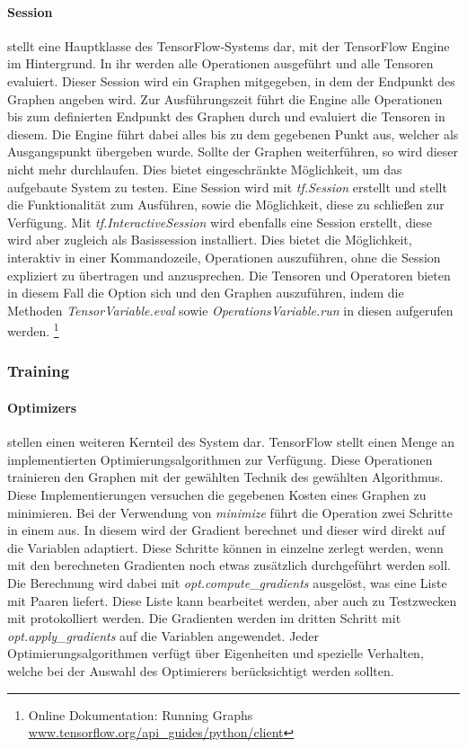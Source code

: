 \paragraph{Session} stellt eine Hauptklasse des TensorFlow-Systems dar, mit der TensorFlow Engine im Hintergrund.
In ihr werden alle Operationen ausgeführt und alle Tensoren evaluiert. 
Dieser Session wird ein Graphen mitgegeben, in dem der Endpunkt des Graphen angeben wird. 
Zur Ausführungszeit führt die Engine alle Operationen bis zum definierten Endpunkt des Graphen durch und evaluiert die Tensoren in diesem. 
Die Engine führt dabei alles bis zu dem gegebenen Punkt aus, welcher als Ausgangspunkt übergeben wurde. 
Sollte der Graphen weiterführen, so wird dieser nicht mehr durchlaufen. 
Dies bietet eingeschränkte Möglichkeit, um das aufgebaute System zu testen. 
Eine Session wird mit \textit{tf.Session} erstellt und stellt die Funktionalität zum Ausführen, sowie die Möglichkeit, diese zu schließen zur Verfügung. 
Mit \textit{tf.InteractiveSession} wird ebenfalls eine Session erstellt, diese wird aber zugleich als Basissession installiert. 
Dies bietet die Möglichkeit, interaktiv in einer Kommandozeile, Operationen auszuführen, ohne die Session expliziert zu übertragen und anzusprechen. 
Die Tensoren und Operatoren bieten in diesem Fall die Option sich und den Graphen auszuführen, indem die Methoden \textit{TensorVariable.eval} sowie \textit{OperationsVariable.run} in diesen aufgerufen werden. 
\footnote{Online Dokumentation: Running Graphs \url{www.tensorflow.org/api_guides/python/client}}

\subsubsection{Training}
\label{training}

\paragraph{Optimizers} stellen einen weiteren Kernteil des System dar. 
TensorFlow stellt einen Menge an implementierten Optimierungsalgorithmen zur Verfügung. 
Diese Operationen trainieren den Graphen mit der gewählten Technik des gewählten Algorithmus. 
Diese Implementierungen versuchen die gegebenen Kosten eines Graphen zu minimieren. 
Bei der Verwendung von \textit{minimize} führt die Operation zwei Schritte in einem aus. 
In diesem wird der Gradient berechnet und dieser wird direkt auf die Variablen adaptiert. 
Diese Schritte können in einzelne zerlegt werden, wenn mit den berechneten Gradienten noch etwas zusätzlich durchgeführt werden soll. 
Die Berechnung wird dabei mit \textit{opt.compute\_gradients} ausgelöst, was eine Liste mit Paaren liefert. 
Diese Liste kann bearbeitet werden, aber auch zu Testzwecken mit protokolliert werden. 
Die Gradienten werden im dritten Schritt mit \textit{opt.apply\_gradients} auf die Variablen angewendet. 
Jeder Optimierungsalgorithmen verfügt über Eigenheiten und spezielle Verhalten, welche bei der Auswahl des Optimierers berücksichtigt werden sollten.

